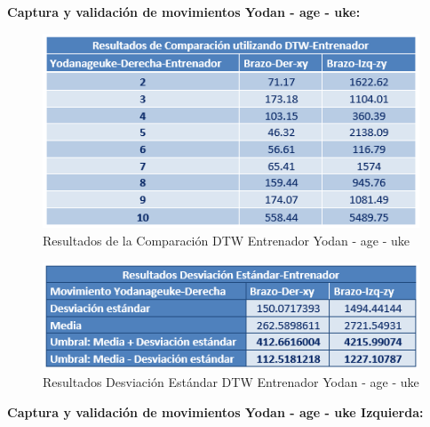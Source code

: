 \textbf{Captura y validación de movimientos Yodan - age - uke:}\\
\begin{figure}[H]%
	\begin{center}
		\includegraphics[scale=1]{./Figuras/Implementacion/Pruebas/Tablas/ResultadosDTW_Entrenador_Yodanageuke}
	\end{center}
	\caption{Resultados de la Comparación DTW Entrenador Yodan - age - uke}
	\label{fig:ResultadosDTW_Entrenador_Yodanageuke}
\end{figure}
\begin{figure}[H]%
	\begin{center}
		\includegraphics[scale=1]{./Figuras/Implementacion/Pruebas/Tablas/ResultadorDesvEstandar_Entrenador_Yodanageuke}
	\end{center}
	\caption{Resultados Desviación Estándar DTW Entrenador Yodan - age - uke}
	\label{fig:ResultadosDTW_Entrenador_Yodanageuke}
\end{figure}
\textbf{Captura y validación de movimientos Yodan - age - uke Izquierda:}\\
